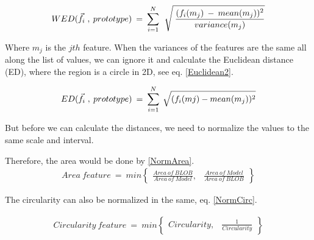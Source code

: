 \begin{equation}	
	\begin{aligned}
{WED(\vec{f}_{i} \; , \: prototype)} \: = \: \displaystyle\sum_{i=1}^N \: \: \sqrt{\mathstrut \:  \displaystyle\frac{(f_{i}(m_{j}) \: - \: mean(m_{j}))^2}{variance(m_{j})}}
\label{Euclidean1}
	\end{aligned}
\end{equation}

Where {$m_{j}$} is the {$jth$} feature. When the variances of the features are the same all along the list of values, we can ignore it and calculate the Euclidean distance (ED), where the region is a circle in 2D, see eq. \ref{Euclidean2}.

\begin{equation}	
	\begin{aligned}
{ED(\vec{f}_{i} \; , \: prototype)} \: = \: \displaystyle\sum_{i=1}^N \: \sqrt{\mathstrut (f_{i}(m{j}) - mean(m_{j}))^2}
\label{Euclidean2}
	\end{aligned}
\end{equation}

But before we can calculate the distances, we need to normalize the values to the same scale and interval.

Therefore, the area would be done by \ref{NormArea}.
\begin{equation}	
	\begin{aligned}
{Area \: feature} \: = \: min \begin{Bmatrix} \displaystyle\frac{Area\:of\:BLOB}{Area\:of\:Model}, & \displaystyle\frac{Area\:of\:Model}{Area\:of\:BLOB}\end{Bmatrix}
\label{NormArea}
	\end{aligned}
\end{equation}

The circularity can also be normalized in the same, eq. \ref{NormCirc}.

\begin{equation}	
	\begin{aligned}
{Circularity \: feature} \: = \: min \begin{Bmatrix} {Circularity}, & \displaystyle\frac{1}{Circularity}\end{Bmatrix}
\label{NormCirc}
	\end{aligned}
\end{equation}

